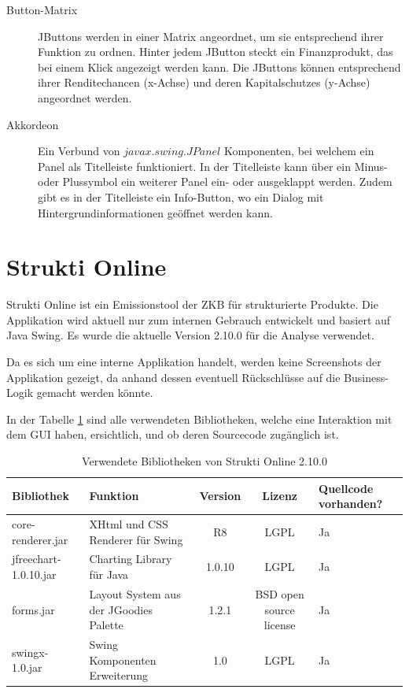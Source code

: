   \begin{description}
    \item[Button-Matrix]
    JButtons werden in einer Matrix angeordnet, um sie entsprechend ihrer
    Funktion zu ordnen. Hinter jedem JButton steckt ein Finanzprodukt, das bei
    einem Klick angezeigt werden kann. Die JButtons können entsprechend
    ihrer Renditechancen (x-Achse) und deren Kapitalschutzes (y-Achse)
    angeordnet werden.
    \item[Akkordeon]
    Ein Verbund von \(javax.swing.JPanel\) Komponenten, bei welchem ein
    Panel als Titelleiste funktioniert. In der Titelleiste kann über ein Minus-
    oder Plussymbol ein weiterer Panel ein- oder ausgeklappt werden. Zudem gibt
    es in der Titelleiste ein Info-Button, wo ein Dialog mit
    Hintergrundinformationen geöffnet werden kann.
  \end{description}
  
  \section{Strukti Online}
  
  Strukti Online ist ein Emissionstool der \ac{ZKB} für strukturierte Produkte.
  Die Applikation wird aktuell nur zum internen Gebrauch entwickelt und basiert
  auf Java Swing. Es wurde die aktuelle Version 2.10.0 für die Analyse
  verwendet.
  
  Da es sich um eine interne Applikation handelt, werden keine Screenshots
  der Applikation gezeigt, da anhand dessen eventuell Rückschlüsse auf die
  Business-Logik gemacht werden könnte.
  
  In der Tabelle \ref{tab:bibliothekenStruktiOnline} sind alle verwendeten
  Bibliotheken, welche eine Interaktion mit dem \ac{GUI} haben, ersichtlich,
  und ob deren Sourcecode zugänglich ist.
  
  \begin{table}[ht]
    \begin{center}
      \begin{tabular}{lp{4.5cm}ccp{2cm}}
        \toprule
        Bibliothek & Funktion & Version & Lizenz & Quellcode vorhanden?\\
        \midrule
        core-renderer.jar & XHtml und CSS Renderer für Swing & R8 & LGPL & Ja\\
        jfreechart-1.0.10.jar & Charting Library für Java & 1.0.10 & LGPL & Ja\\
        forms.jar & Layout System aus der JGoodies Palette & 1.2.1 & BSD open
        source license & Ja\\
        swingx-1.0.jar & Swing Komponenten Erweiterung & 1.0 & LGPL & Ja\\
        \bottomrule
      \end{tabular}
      \caption{Verwendete Bibliotheken von Strukti Online 2.10.0}
      \label{tab:bibliothekenStruktiOnline}
    \end{center}
  \end{table}
  
